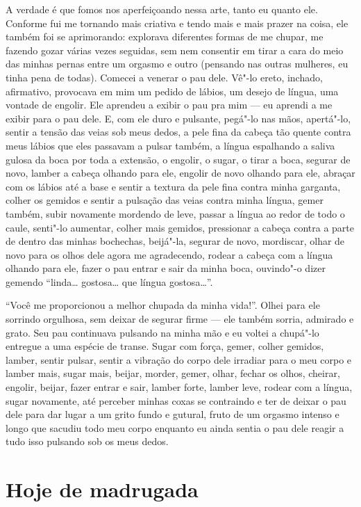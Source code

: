 A verdade é que fomos nos aperfeiçoando nessa arte, tanto eu quanto ele.
Conforme fui me tornando mais criativa e tendo mais e mais prazer na
coisa, ele também foi se aprimorando: explorava diferentes formas de me
chupar, me fazendo gozar várias vezes seguidas, sem nem consentir em
tirar a cara do meio das minhas pernas entre um orgasmo e outro
(pensando nas outras mulheres, eu tinha pena de todas). Comecei a
venerar o pau dele. Vê"-lo ereto, inchado, afirmativo, provocava em mim
um pedido de lábios, um desejo de língua, uma vontade de engolir. Ele
aprendeu a exibir o pau pra mim --- eu aprendi a me exibir para o pau
dele. E, com ele duro e pulsante, pegá"-lo nas mãos, apertá"-lo, sentir a
tensão das veias sob meus dedos, a pele fina da cabeça tão quente contra
meus lábios que eles passavam a pulsar também, a língua espalhando a
saliva gulosa da boca por toda a extensão, o engolir, o sugar, o tirar a
boca, segurar de novo, lamber a cabeça olhando para ele, engolir de novo
olhando para ele, abraçar com os lábios até a base e sentir a textura da
pele fina contra minha garganta, colher os gemidos e sentir a pulsação
das veias contra minha língua, gemer também, subir novamente mordendo de
leve, passar a língua ao redor de todo o caule, senti"-lo aumentar,
colher mais gemidos, pressionar a cabeça contra a parte de dentro das
minhas bochechas, beijá"-la, segurar de novo, mordiscar, olhar de novo
para os olhos dele agora me agradecendo, rodear a cabeça com a língua
olhando para ele, fazer o pau entrar e sair da minha boca, ouvindo"-o
dizer gemendo ``linda… gostosa… que língua
gostosa…''.

``Você me proporcionou a melhor chupada da minha vida!''. Olhei para ele
sorrindo orgulhosa, sem deixar de segurar firme --- ele também sorria,
admirado e grato. Seu pau continuava pulsando na minha mão e eu voltei a
chupá"-lo entregue a uma espécie de transe. Sugar com força, gemer,
colher gemidos, lamber, sentir pulsar, sentir a vibração do corpo dele
irradiar para o meu corpo e lamber mais, sugar mais, beijar, morder,
gemer, olhar, fechar os olhos, cheirar, engolir, beijar, fazer entrar e
sair, lamber forte, lamber leve, rodear com a língua, sugar novamente,
até perceber minhas coxas se contraindo e ter de deixar o pau dele para
dar lugar a um grito fundo e gutural, fruto de um orgasmo intenso e
longo que sacudiu todo meu corpo enquanto eu ainda sentia o pau dele
reagir a tudo isso pulsando sob os meus dedos.

\chapter{Hoje de madrugada}

